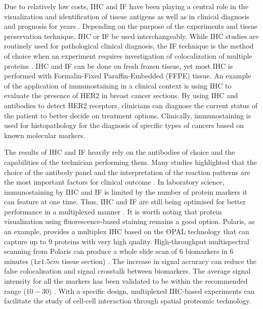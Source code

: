 Due to relatively low costs, IHC and IF have been playing a central role in the visualization and identification of tissue antigens as well as in clinical diagnosis and prognosis for years \cite{ducheyne2015comprehensive, rupprecht2015current}. Depending on the purpose of the experiments and tissue preservation technique, IHC or IF be used interchangeably. While IHC studies are routinely used for pathological clinical diagnosis, the IF technique is the method of choice when an experiment requires investigation of colocalization of multiple proteins \cite{joshi2017immunofluorescence}. IHC and IF can be done on fresh frozen tissue, yet most IHC is performed with Formalin-Fixed Paraffin-Embedded (FFPE) tissue. An example of the application of immunostaining in a clinical context is using IHC to evaluate the presence of HER2 in breast cancer sections. By using IHC and antibodies to detect HER2 receptors, clinicians can diagnose the current status of the patient to better decide on treatment options. Clinically, immunostaining is used for histopathology for the diagnosis of specific types of cancers based on known molecular markers.  

The results of IHC and IF heavily rely on the antibodies of choice and the capabilities of the technician performing them. Many studies highlighted that the choice of the antibody panel and the interpretation of the reaction patterns are the most important factors for  clinical outcome \cite{de2010immunohistochemistry, jensen1997immunohistochemistry}. In laboratory science, immunostaining by IHC and IF is limited by the number of protein markers it can feature at one time. Thus, IHC and IF are still being optimised for better performance in a multiplexed manner \cite{joshi2017immunofluorescence}. It is worth noting that protein visualization using fluorescence-based staining remains a good option. Polaris, as an example, provides a multiplex IHC based on the OPAL technology that can capture up to 9 proteins with very high quality. High-throughput multispectral scanning from Polaris can produce a whole slide scan of 6 biomarkers in 6 minutes ($1x1.5cm$ tissue section) \cite{hoyt2021multiplex, baharlou2019mass,marc201934th}. The increase in signal accuracy can reduce the false colocalisation and signal crosstalk between biomarkers. The average signal intensity for all the markers has been validated to be within the recommended range ($10-30$) \cite{donovan2021924}. With a specific design, multiplexed IHC-based experiments can facilitate the study of cell-cell interaction through spatial proteomic technology.  

